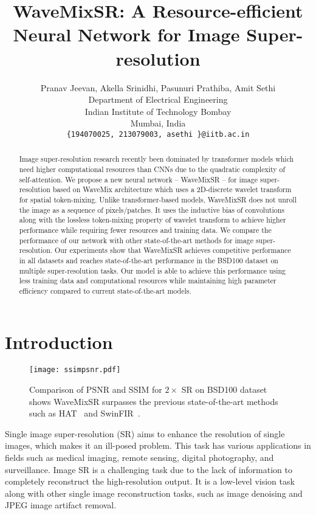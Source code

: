 \documentclass{article}
\title{WaveMixSR: A Resource-efficient Neural Network for Image Super-resolution
}
\author{
  Pranav Jeevan, Akella Srinidhi, Pasunuri Prathiba, Amit Sethi \\
  Department of Electrical Engineering \\
  Indian Institute of Technology Bombay \\
  Mumbai, India\\
  \texttt{\{194070025, 213079003, asethi \}@iitb.ac.in} \\
\And
}
\begin{document}
\maketitle


\begin{abstract}
Image super-resolution research recently been dominated by transformer models which need higher computational resources than CNNs due to the quadratic complexity of self-attention. We propose a new neural network -- WaveMixSR -- for image super-resolution based on WaveMix architecture which uses a 2D-discrete wavelet transform for spatial token-mixing. Unlike transformer-based models, WaveMixSR does not unroll the image as a sequence of pixels/patches. It uses the inductive bias of convolutions along with the lossless token-mixing property of wavelet transform to achieve higher performance while requiring fewer resources and training data. We compare the performance of our network with other state-of-the-art methods for image super-resolution. Our experiments show that WaveMixSR achieves competitive performance in all datasets and reaches state-of-the-art performance in the BSD100 dataset on multiple super-resolution tasks. Our model is able to achieve this performance using less training data and computational resources while maintaining high parameter efficiency compared to current state-of-the-art models.
\end{abstract}




\section{Introduction}
\label{sec:intro}

\begin{figure}[b]

\centering
\texttt{[image: ssimpsnr.pdf]}
\caption{Comparison of PSNR and SSIM for $2\times$ SR on BSD100 dataset shows WaveMixSR surpasses the previous state-of-the-art methods such as HAT~\cite{Chen_2023_CVPR} and SwinFIR~\cite{zhang2023swinfir}.}
\label{fig:graph}

\end{figure}



Single image super-resolution (SR) aims to enhance the resolution of single images, which makes it an ill-posed problem. This task has various applications in fields such as medical imaging, remote sensing, digital photography, and surveillance. Image SR is a challenging task due to the lack of information to completely reconstruct the high-resolution output. It is a low-level vision task along with other single image reconstruction tasks, such as image denoising and JPEG image artifact removal. 
\end{document}
